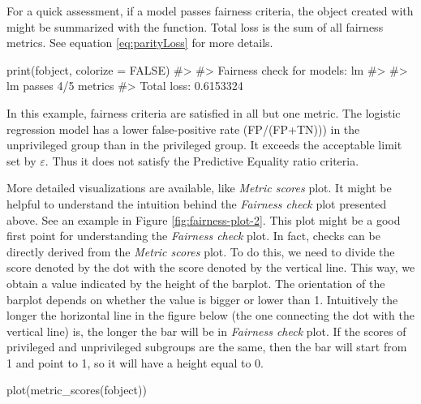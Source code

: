 For a quick assessment, if a model passes fairness criteria, the object
created with  might be summarized with the
 function. Total loss is the sum of all fairness
metrics. See equation \ref{eq:parityLoss} for more details.

\begin{example}
print(fobject, colorize = FALSE)
#> 
#> Fairness check for models: lm 
#> 
#> lm passes 4/5 metrics
#> Total loss:  0.6153324
\end{example}

In this example, fairness criteria are satisfied in all but one metric.
The logistic regression model has a lower false-positive rate
(FP/(FP+TN))) in the unprivileged group than in the privileged group. It
exceeds the acceptable limit set by \(\varepsilon\). Thus it does not
satisfy the Predictive Equality ratio criteria.

More detailed visualizations are available, like \emph{Metric scores}
plot. It might be helpful to understand the intuition behind the
\emph{Fairness check} plot presented above. See an example in Figure
\ref{fig:fairness-plot-2}. This plot might be a good first point for
understanding the \emph{Fairness check} plot. In fact, checks can be
directly derived from the \emph{Metric scores} plot. To do this, we need
to divide the score denoted by the dot with the score denoted by the
vertical line. This way, we obtain a value indicated by the height of
the barplot. The orientation of the barplot depends on whether the value
is bigger or lower than 1. Intuitively the longer the horizontal line in
the figure below (the one connecting the dot with the vertical line) is,
the longer the bar will be in \emph{Fairness check} plot. If the scores
of privileged and unprivileged subgroups are the same, then the bar will
start from 1 and point to 1, so it will have a height equal to 0.

\begin{example}
plot(metric_scores(fobject))
\end{example}

